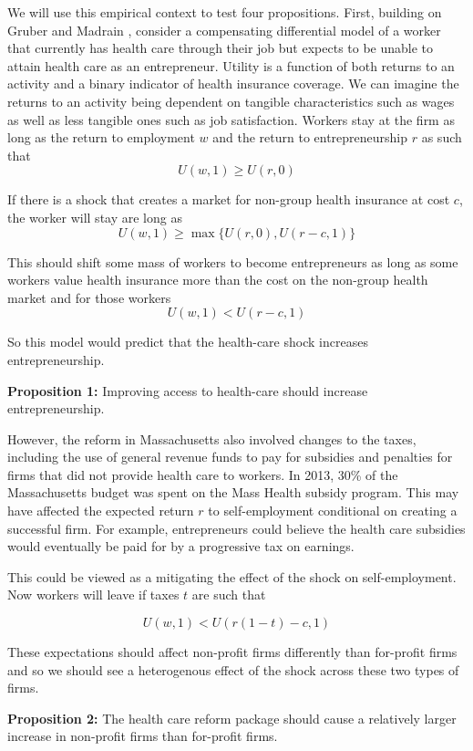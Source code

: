 \documentclass[12pt]{article}
\begin{document}
We will use this empirical context to test four propositions. First, building on Gruber and Madrain \cite{gm2002}, consider a compensating differential model of a worker that currently has health care through their job but expects to be unable to attain health care as an entrepreneur. Utility is a function of both returns to an activity and a binary indicator of health insurance coverage. We can imagine the returns to an activity being dependent on tangible characteristics such as wages as well as less tangible ones such as job satisfaction. Workers stay at the firm as long as the return to employment $w$ and the return to entrepreneurship $r$ as such that
$$U(w,1) \ge U(r,0)$$

If there is a shock that creates a market for non-group health insurance at cost $c$, the worker will stay are long as
$$U(w,1) \ge \max\{U(r,0),U(r-c,1)\}$$

This should shift some mass of workers to become entrepreneurs as long as some workers value health insurance more than the cost on the non-group health market and for those workers
$$U(w,1) < U(r-c,1)$$

So this model would predict that the health-care shock increases entrepreneurship. 

\textbf{Proposition 1:} 
Improving access to health-care should increase entrepreneurship. 

However, the reform in Massachusetts also involved changes to the taxes, including the use of general revenue funds to pay for subsidies and penalties for firms that did not provide health care to workers. In 2013, 30\% of the Massachusetts budget was spent on the Mass Health \cite{masshealth} subsidy program. This may have affected the expected  return $r$ to self-employment conditional on creating a successful firm. For example, entrepreneurs could believe the health care subsidies would eventually be paid for by a progressive tax on earnings.

This could be viewed as a mitigating the effect of the shock on self-employment. Now workers will leave if taxes $t$ are such that

$$U(w,1) < U(r(1-t)-c,1)$$

These expectations should affect non-profit firms differently than for-profit firms and so we should see a heterogenous effect of the shock across these two types of firms. 

\textbf{Proposition 2:} 
The health care reform package should cause a relatively larger increase in non-profit firms than for-profit firms. 
\end{document}
